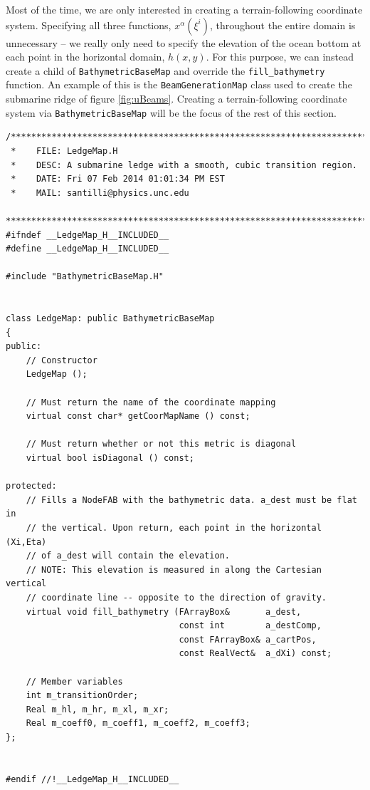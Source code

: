 \documentclass[12pt]{article}
\begin{document}
Most of the time, we are only interested in creating a terrain-following coordinate system. Specifying all three functions, $x^{\alpha}(\xi^i)$, throughout the entire domain is unnecessary -- we really only need to specify the elevation of the ocean bottom at each point in the horizontal domain, $h(x,y)$. For this purpose, we can instead create a child of \texttt{BathymetricBaseMap} and override the \texttt{fill\_bathymetry} function. An example of this is the \texttt{BeamGenerationMap} class used to create the submarine ridge of figure \ref{fig:uBeams}. Creating a terrain-following coordinate system via \texttt{BathymetricBaseMap} will be the focus of the rest of this section.

\begin{lstlisting}[caption={The \texttt{LedgeMap} class header.},label=lstLedgeMapH]
/*************************************************************************
 *    FILE: LedgeMap.H
 *    DESC: A submarine ledge with a smooth, cubic transition region.
 *    DATE: Fri 07 Feb 2014 01:01:34 PM EST
 *    MAIL: santilli@physics.unc.edu
 ************************************************************************/
#ifndef __LedgeMap_H__INCLUDED__
#define __LedgeMap_H__INCLUDED__

#include "BathymetricBaseMap.H"


class LedgeMap: public BathymetricBaseMap
{
public:
    // Constructor
    LedgeMap ();

    // Must return the name of the coordinate mapping
    virtual const char* getCoorMapName () const;

    // Must return whether or not this metric is diagonal
    virtual bool isDiagonal () const;

protected:
    // Fills a NodeFAB with the bathymetric data. a_dest must be flat in
    // the vertical. Upon return, each point in the horizontal (Xi,Eta)
    // of a_dest will contain the elevation.
    // NOTE: This elevation is measured in along the Cartesian vertical
    // coordinate line -- opposite to the direction of gravity.
    virtual void fill_bathymetry (FArrayBox&       a_dest,
                                  const int        a_destComp,
                                  const FArrayBox& a_cartPos,
                                  const RealVect&  a_dXi) const;

	// Member variables
    int m_transitionOrder;
    Real m_hl, m_hr, m_xl, m_xr;
    Real m_coeff0, m_coeff1, m_coeff2, m_coeff3;
};


#endif //!__LedgeMap_H__INCLUDED__
\end{lstlisting}
\end{document}
